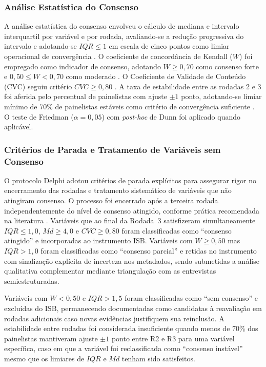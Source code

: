 \documentclass[preprint,authoryear,12pt]{elsarticle}
\begin{document}
\subsubsection{Análise Estatística do Consenso}

A análise estatística do consenso envolveu o cálculo de mediana e intervalo interquartil por variável e por rodada, avaliando-se a redução progressiva do intervalo e adotando-se $IQR \leq 1$ em escala de cinco pontos como limiar operacional de convergência \citep{VonDerGracht2012}. O coeficiente de concordância de Kendall ($W$) foi empregado como indicador de consenso, adotando $W \geq 0{,}70$ como consenso forte e $0{,}50 \leq W < 0{,}70$ como moderado \citep{Schmidt2014}. O Coeficiente de Validade de Conteúdo (CVC) seguiu critério $CVC \geq 0{,}80$ \citep{Hernandez-Nieto2002}. A taxa de estabilidade entre as rodadas 2 e 3 foi aferida pelo percentual de painelistas com ajuste $\pm 1$ ponto, adotando-se limiar mínimo de 70\% de painelistas estáveis como critério de convergência suficiente \citep{Dajani1979}. O teste de Friedman ($\alpha = 0{,}05$) com \textit{post-hoc} de Dunn foi aplicado quando aplicável.

\subsubsection{Critérios de Parada e Tratamento de Variáveis sem Consenso}
\label{sec:delphi_parada}

O protocolo Delphi adotou critérios de parada explícitos para assegurar rigor no encerramento das rodadas e tratamento sistemático de variáveis que não atingiram consenso. O processo foi encerrado após a terceira rodada independentemente do nível de consenso atingido, conforme prática recomendada na literatura \citep{Diamond2014}. Variáveis que ao final da Rodada~3 satisfizeram simultaneamente $IQR \leq 1{,}0$, $Md \geq 4{,}0$ e $CVC \geq 0{,}80$ foram classificadas como ``consenso atingido'' e incorporadas ao instrumento ISB. Variáveis com $W \geq 0{,}50$ mas $IQR > 1{,}0$ foram classificadas como ``consenso parcial'' e retidas no instrumento com sinalização explícita de incerteza nos metadados, sendo submetidas a análise qualitativa complementar mediante triangulação com as entrevistas semiestruturadas.

Variáveis com $W < 0{,}50$ e $IQR > 1{,}5$ foram classificadas como ``sem consenso'' e excluídas do ISB, permanecendo documentadas como candidatas à reavaliação em rodadas adicionais caso novas evidências justifiquem sua reinclusão. A estabilidade entre rodadas foi considerada insuficiente quando menos de 70\% dos painelistas mantiveram ajuste $\pm 1$ ponto entre R2 e R3 para uma variável específica, caso em que a variável foi reclassificada como ``consenso instável'' mesmo que os limiares de $IQR$ e $Md$ tenham sido satisfeitos.
\end{document}
